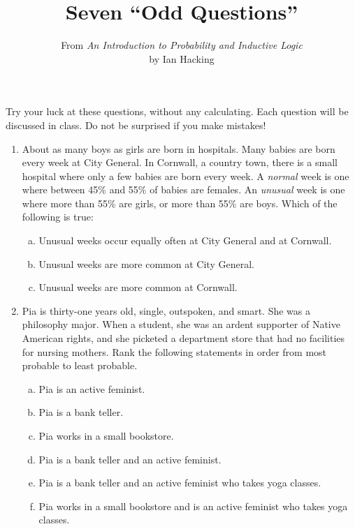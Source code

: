 \documentclass[11pt]{article}
\title{Seven ``Odd Questions''}
\author{From \emph{An Introduction to Probability and Inductive Logic}\\ by Ian Hacking}
\date{}
\begin{document}
 
\maketitle

\noindent Try your luck at these questions, without any calculating.
Each question will be discussed in class.
Do not be surprised if you make mistakes!

\begin{enumerate}
	\item About as many boys as girls are born in hospitals. Many babies are born every week at City 	General. In Cornwall, a country town, there is a small hospital where only a few babies are born 		every week. A \emph{normal} week is one where between 45\% and 55\% of babies are 				females. An \emph{unusual} week is one where more than 55\% are girls, or more than 55\% are 	boys. Which of the following is true:
	\begin{enumerate}[(a)]
		\item Unusual weeks occur equally often at City General and at Cornwall.
		\item Unusual weeks are more common at City General.
		\item Unusual weeks are more common at Cornwall.
	\end{enumerate}
	
	\item Pia is thirty-one years old, single, outspoken, and smart. She was a philosophy major. 			When a student, she was an ardent supporter of Native American rights, and she picketed a 			department store that had no facilities for nursing mothers. 
	Rank the following statements in order from most probable to least probable.
	\begin{enumerate}[(a)]
		\item Pia is an active feminist.
		\item Pia is a bank teller.
		\item Pia works in a small bookstore.
		\item Pia is a bank teller and an active feminist.
		\item Pia is a bank teller and an active feminist who takes yoga classes.
		\item Pia works in a small bookstore and is an active feminist who takes yoga classes.
	\end{enumerate}
	

\end{enumerate}
\end{document}

